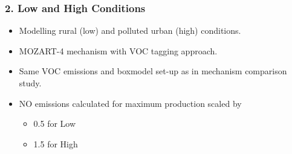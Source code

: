 \begin{frame}
    \frametitle{2. Low and High  Conditions}

    \begin{itemize}
        \item Modelling rural (low) and polluted urban (high)  conditions.
        \item MOZART-4 mechanism with VOC tagging approach.
        \item Same VOC emissions and boxmodel set-up as in mechanism comparison study.
        \item NO emissions calculated for maximum  production scaled by
            \begin{itemize}
                \item 0.5 for Low 
                \item 1.5 for High 
            \end{itemize}
    \end{itemize}
\end{frame}

{
    \begin{frame}[plain]
    \end{frame}
}

